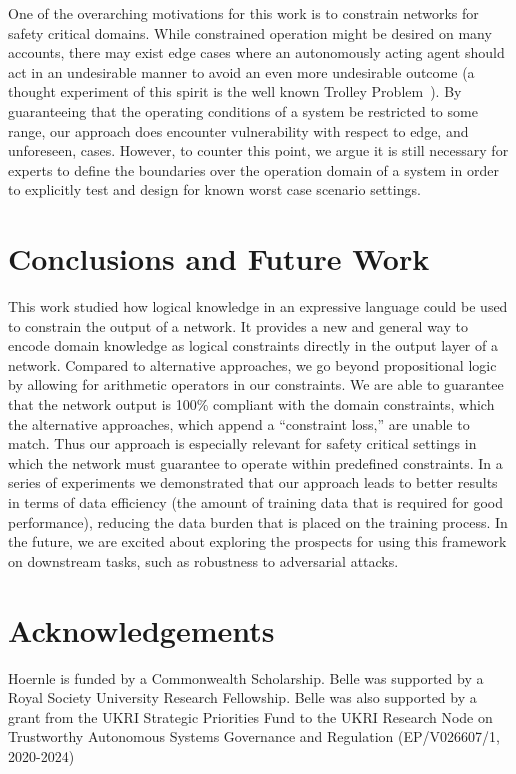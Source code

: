 \documentclass[letterpaper]{article} %
\begin{document}
One of the overarching motivations for this work is to constrain networks for safety critical domains.
While constrained operation might be desired on many accounts, there may exist edge cases where an autonomously acting agent should act in an undesirable manner to avoid an even more undesirable outcome (a thought experiment of this spirit is the well known Trolley Problem~\citep{hammond2021learning}).
By guaranteeing that the operating conditions of a system be restricted to some range, our approach does encounter vulnerability with respect to  edge, and unforeseen, cases.
However, to counter this point,  we argue it is still necessary for experts to define the boundaries over the operation domain of a system in order to explicitly test and design for known worst case scenario settings.  


\section{Conclusions and Future Work}

This work studied  how logical knowledge in an expressive language could be used to constrain the output of a network.
It provides a new and general way to encode domain knowledge as logical constraints directly in the output layer of a network. 
Compared to  alternative approaches, we go beyond propositional logic by allowing for arithmetic operators in our constraints.
We are able to guarantee that the network output is 100\% compliant with the  domain constraints, which the alternative approaches, which append a ``constraint loss,'' are unable to match. Thus our approach is especially relevant for safety critical settings in which the network  must guarantee to operate within predefined constraints.
In a series of experiments we demonstrated that our approach leads to better results in terms of data efficiency (the amount of training data that is required for good performance), reducing the data burden that is placed on the training process.
In the future, we are excited about exploring the prospects for using this framework on downstream tasks, such as robustness to adversarial attacks.
 
% 
\section*{Acknowledgements}
Hoernle is funded by a Commonwealth Scholarship. Belle was supported by a Royal Society University Research Fellowship. Belle was also supported by a grant from the UKRI Strategic Priorities Fund to the UKRI Research Node on Trustworthy Autonomous Systems Governance and Regulation (EP/V026607/1, 2020-2024)
\end{document}
